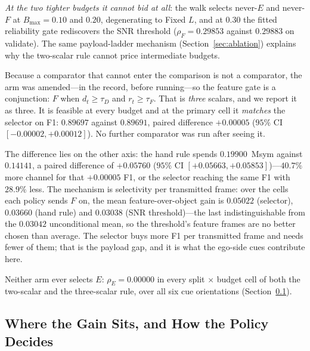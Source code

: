 \documentclass[journal]{IEEEtran}
\begin{document}
\emph{At the two tighter budgets it cannot bid at all}: the walk selects never-$E$ and never-$F$ at $B_{\max}=0.10$ and $0.20$, degenerating to Fixed $L$, and at $0.30$ the fitted reliability gate rediscovers the SNR threshold ($\rho_F=0.29853$ against $0.29883$ on validate). The same payload-ladder mechanism (Section~\ref{sec:ablation}) explains why the two-scalar rule cannot price intermediate budgets.

Because a comparator that cannot enter the comparison is not a comparator, the arm was amended---in the record, before running---so the feature gate is a conjunction: $F$ when $d_t\ge\tau_D$ and $r_t\ge\tau_F$. That is \emph{three} scalars, and we report it as three. It is feasible at every budget and at the primary cell it \emph{matches} the selector on F1: $0.89697$ against $0.89691$, paired difference $+0.00005$ ($95\%$ CI $[-0.00002,+0.00012]$). No further comparator was run after seeing it.

The difference lies on the other axis: the hand rule spends $0.19900$~Msym against $0.14141$, a paired difference of $+0.05760$ ($95\%$ CI $[+0.05663,+0.05853]$)---$40.7\%$ more channel for that $+0.00005$ F1, or the selector reaching the same F1 with $28.9\%$ less. The mechanism is selectivity per transmitted frame: over the cells each policy sends $F$ on, the mean feature-over-object gain is $0.05022$ (selector), $0.03660$ (hand rule) and $0.03038$ (SNR threshold)---the last indistinguishable from the $0.03042$ unconditional mean, so the threshold's feature frames are no better chosen than average. The selector buys more F1 per transmitted frame and needs fewer of them; that is the payload gap, and it is what the ego-side cues contribute here.

Neither arm ever selects $E$: $\rho_E=0.00000$ in every split $\times$ budget cell of both the
two-scalar and the three-scalar rule, over all six cue orientations
(Section~\ref{sec:decision_ratio}).


\subsection{Where the Gain Sits, and How the Policy Decides}\label{sec:decision_ratio}
\end{document}
